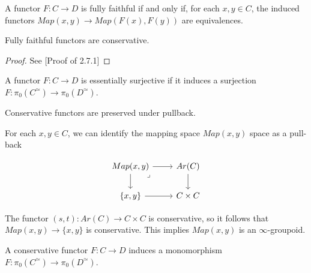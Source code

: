\begin{proposition}\label{prop:FF}
    A functor $F:C\rightarrow D$ is fully faithful if and only if, for each $x,y\in C$, the induced functors $Map(x,y)\rightarrow Map(F(x),F(y))$ are equivalences.
\end{proposition}

\begin{theorem}\label{thm:FF-is-cons}
    Fully faithful functors are conservative.
\end{theorem}
\begin{proof}
    See \cite{Haugseng-categories-intro}[Proof of 2.7.1]
\end{proof}

\begin{definition}
    A functor $F:C\rightarrow D$ is essentially surjective if it induces a surjection $F:\pi_0(C^\simeq)\rightarrow \pi_0(D^\simeq)$.
\end{definition}



\begin{proposition}
    Conservative functors are preserved under pullback.
\end{proposition}

For each $x,y\in C$, we can identify the mapping space $Map(x,y)$ space as a pull-back

\[\begin{tikzcd}
	{Map(x,y)} & {Ar(C)} \\
	{\{x,y\}} & {C\times C}
	\arrow[from=1-1, to=1-2]
	\arrow[from=1-1, to=2-1]
	\arrow["\lrcorner"{anchor=center, pos=0.125}, draw=none, from=1-1, to=2-2]
	\arrow[from=1-2, to=2-2]
	\arrow[from=2-1, to=2-2]
\end{tikzcd}\]

The functor $(s,t):Ar(C)\rightarrow C\times C$ is conservative, so it follows that $Map(x,y)\rightarrow \{x,y\}$ is conservative. This implies $Map(x,y)$ is an $\infty$-groupoid.

\begin{proposition}
    A conservative functor $F:C\rightarrow D$ induces a monomorphism $F:\pi_0(C^\simeq)\rightarrow \pi_0(D^\simeq)$.
\end{proposition}

